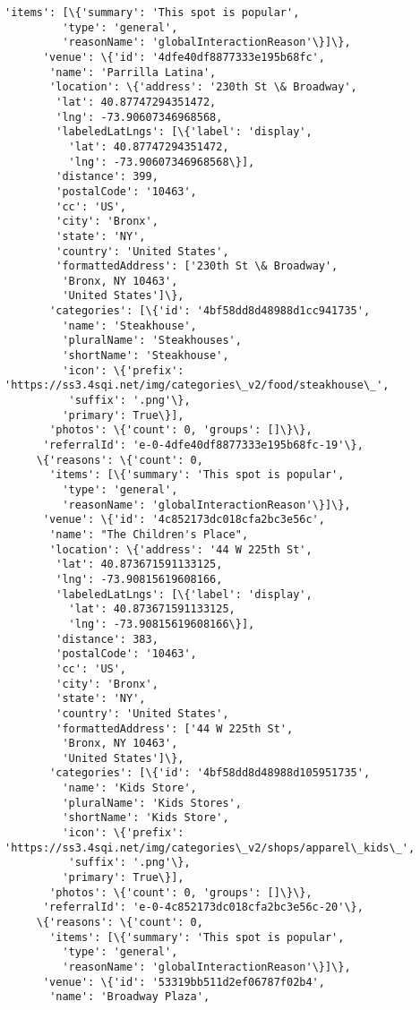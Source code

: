 \documentclass[11pt]{article}
\begin{document}
\begin{tcolorbox}[breakable, size=fbox, boxrule=.5pt, pad at break*=1mm, opacityfill=0]
\begin{Verbatim}[commandchars=\\\{\}]
       'items': [\{'summary': 'This spot is popular',
         'type': 'general',
         'reasonName': 'globalInteractionReason'\}]\},
      'venue': \{'id': '4dfe40df8877333e195b68fc',
       'name': 'Parrilla Latina',
       'location': \{'address': '230th St \& Broadway',
        'lat': 40.87747294351472,
        'lng': -73.90607346968568,
        'labeledLatLngs': [\{'label': 'display',
          'lat': 40.87747294351472,
          'lng': -73.90607346968568\}],
        'distance': 399,
        'postalCode': '10463',
        'cc': 'US',
        'city': 'Bronx',
        'state': 'NY',
        'country': 'United States',
        'formattedAddress': ['230th St \& Broadway',
         'Bronx, NY 10463',
         'United States']\},
       'categories': [\{'id': '4bf58dd8d48988d1cc941735',
         'name': 'Steakhouse',
         'pluralName': 'Steakhouses',
         'shortName': 'Steakhouse',
         'icon': \{'prefix':
'https://ss3.4sqi.net/img/categories\_v2/food/steakhouse\_',
          'suffix': '.png'\},
         'primary': True\}],
       'photos': \{'count': 0, 'groups': []\}\},
      'referralId': 'e-0-4dfe40df8877333e195b68fc-19'\},
     \{'reasons': \{'count': 0,
       'items': [\{'summary': 'This spot is popular',
         'type': 'general',
         'reasonName': 'globalInteractionReason'\}]\},
      'venue': \{'id': '4c852173dc018cfa2bc3e56c',
       'name': "The Children's Place",
       'location': \{'address': '44 W 225th St',
        'lat': 40.873671591133125,
        'lng': -73.90815619608166,
        'labeledLatLngs': [\{'label': 'display',
          'lat': 40.873671591133125,
          'lng': -73.90815619608166\}],
        'distance': 383,
        'postalCode': '10463',
        'cc': 'US',
        'city': 'Bronx',
        'state': 'NY',
        'country': 'United States',
        'formattedAddress': ['44 W 225th St',
         'Bronx, NY 10463',
         'United States']\},
       'categories': [\{'id': '4bf58dd8d48988d105951735',
         'name': 'Kids Store',
         'pluralName': 'Kids Stores',
         'shortName': 'Kids Store',
         'icon': \{'prefix':
'https://ss3.4sqi.net/img/categories\_v2/shops/apparel\_kids\_',
          'suffix': '.png'\},
         'primary': True\}],
       'photos': \{'count': 0, 'groups': []\}\},
      'referralId': 'e-0-4c852173dc018cfa2bc3e56c-20'\},
     \{'reasons': \{'count': 0,
       'items': [\{'summary': 'This spot is popular',
         'type': 'general',
         'reasonName': 'globalInteractionReason'\}]\},
      'venue': \{'id': '53319bb511d2ef06787f02b4',
       'name': 'Broadway Plaza',

\end{Verbatim}
\end{tcolorbox}
\end{document}
